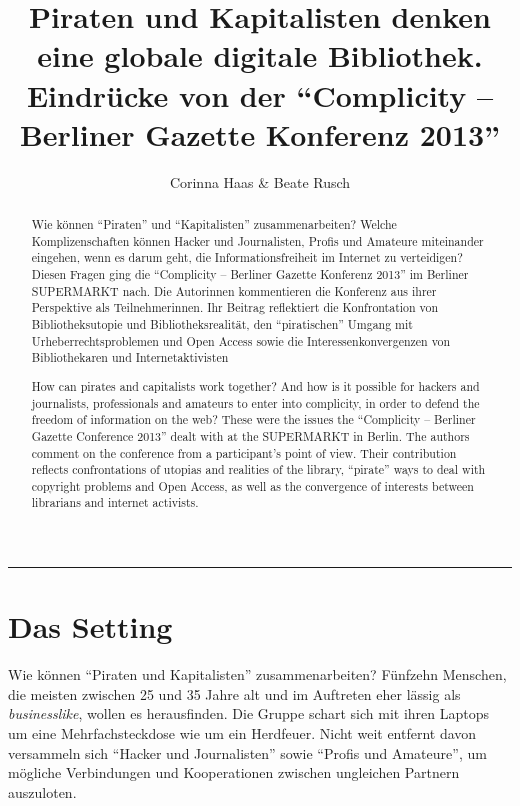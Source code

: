 \documentclass[a4paper,
fontsize=11pt,
oneside,
numbers=noperiodatend,
parskip=half-,
bibliography=totoc,
final
]{scrartcl}
\title{\LARGE{Piraten und Kapitalisten denken eine globale digitale Bibliothek. Eindrücke von der \enquote{Complicity – Berliner Gazette Konferenz 2013}}} %
\author{Corinna Haas \& Beate Rusch} %
\date{}
\begin{document}
\maketitle
\thispagestyle{fancyplain} 

\begin{center}
\end{center}

\begin{abstract}
\small
Wie können \enquote{Piraten} und \enquote{Kapitalisten} zusammenarbeiten? Welche Komplizenschaften können Hacker und Journalisten, Profis und Amateure miteinander eingehen, wenn es darum geht, die Informationsfreiheit im Internet zu verteidigen? Diesen Fragen ging die \enquote{Complicity – Berliner Gazette Konferenz 2013} im Berliner SUPERMARKT nach. Die Autorinnen kommentieren die Konferenz aus ihrer Perspektive als Teilnehmerinnen. Ihr Beitrag reflektiert die Konfrontation von Bibliotheksutopie und Bibliotheksrealität, den \enquote{piratischen} Umgang mit Urheberrechtsproblemen und Open Access sowie die Interessenkonvergenzen von Bibliothekaren und Internetaktivisten
\end{abstract}

\begin{abstract}
\small
How can pirates and capitalists work together? And how is it possible for hackers and journalists, professionals and amateurs to enter into complicity, in order to defend the freedom of information on the web? These were the issues the \enquote{Complicity – Berliner Gazette Conference 2013} dealt with at the SUPERMARKT in Berlin. The authors comment on the conference from a participant’s point of view. Their contribution reflects confrontations of utopias and realities of the library, \enquote{pirate} ways to deal with copyright problems and Open Access, as well as the convergence of interests between librarians and internet activists.
\end{abstract}

\begin{center}\rule{3in}{0.4pt}\end{center}

\section*{Das Setting}\label{das-setting}

Wie können \enquote{Piraten und Kapitalisten} zusammenarbeiten? Fünfzehn
Menschen, die meisten zwischen 25 und 35 Jahre alt und im Auftreten eher
lässig als \emph{businesslike}, wollen es herausfinden. Die Gruppe
schart sich mit ihren Laptops um eine Mehrfachsteckdose wie um ein
Herdfeuer. Nicht weit entfernt davon versammeln sich \enquote{Hacker und
Journalisten} sowie \enquote{Profis und Amateure}, um mögliche
Verbindungen und Kooperationen zwischen ungleichen Partnern auszuloten.
\end{document}
